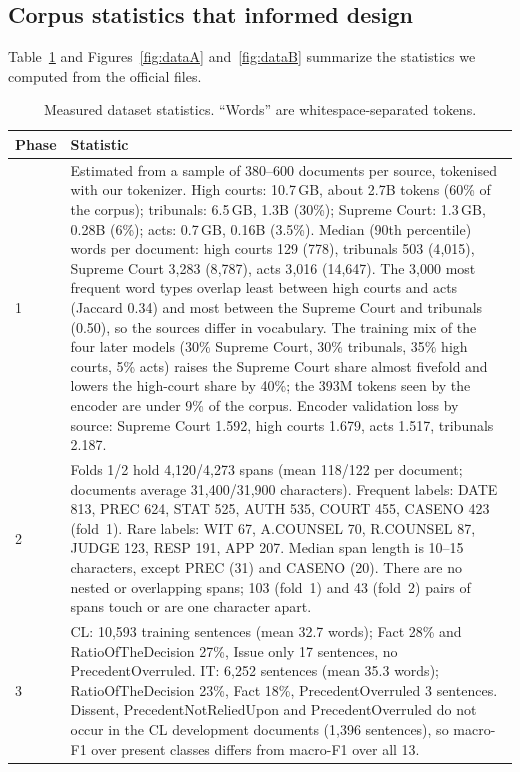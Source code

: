 \documentclass[10pt,a4paper]{article}
\begin{document}
\subsection{Corpus statistics that informed design}
Table~\ref{tab:data} and Figures~\ref{fig:dataA} and~\ref{fig:dataB} summarize the statistics we computed from the official files.
\begin{table}[h]\centering\footnotesize
\caption{Measured dataset statistics. ``Words'' are whitespace-separated tokens.}\label{tab:data}
\begin{tabular}{@{}lp{12.3cm}@{}}
\toprule
Phase & Statistic\\\midrule
1 & Estimated from a sample of 380--600 documents per source, tokenised with our tokenizer. High courts: 10.7\,GB, about 2.7B tokens (60\% of the corpus); tribunals: 6.5\,GB, 1.3B (30\%); Supreme Court: 1.3\,GB, 0.28B (6\%); acts: 0.7\,GB, 0.16B (3.5\%). Median (90th percentile) words per document: high courts 129 (778), tribunals 503 (4{,}015), Supreme Court 3{,}283 (8{,}787), acts 3{,}016 (14{,}647). The 3{,}000 most frequent word types overlap least between high courts and acts (Jaccard 0.34) and most between the Supreme Court and tribunals (0.50), so the sources differ in vocabulary. The training mix of the four later models (30\% Supreme Court, 30\% tribunals, 35\% high courts, 5\% acts) raises the Supreme Court share almost fivefold and lowers the high-court share by 40\%; the 393M tokens seen by the encoder are under 9\% of the corpus. Encoder validation loss by source: Supreme Court 1.592, high courts 1.679, acts 1.517, tribunals 2.187.\\
2 & Folds 1/2 hold 4{,}120/4{,}273 spans (mean 118/122 per document; documents average 31{,}400/31{,}900 characters). Frequent labels: DATE 813, PREC 624, STAT 525, AUTH 535, COURT 455, CASENO 423 (fold~1). Rare labels: WIT 67, A.COUNSEL 70, R.COUNSEL 87, JUDGE 123, RESP 191, APP 207. Median span length is 10--15 characters, except PREC (31) and CASENO (20). There are no nested or overlapping spans; 103 (fold~1) and 43 (fold~2) pairs of spans touch or are one character apart.\\
3 & CL: 10{,}593 training sentences (mean 32.7 words); Fact 28\% and RatioOfTheDecision 27\%, Issue only 17 sentences, no PrecedentOverruled. IT: 6{,}252 sentences (mean 35.3 words); RatioOfTheDecision 23\%, Fact 18\%, PrecedentOverruled 3 sentences. Dissent, PrecedentNotReliedUpon and PrecedentOverruled do not occur in the CL development documents (1{,}396 sentences), so macro-F1 over present classes differs from macro-F1 over all 13.\\

\end{tabular}
\end{table}
\end{document}
